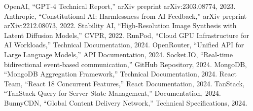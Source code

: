 \documentclass[conference]{IEEEtran}
\begin{document}
\begin{thebibliography}{00}
 OpenAI, ``GPT-4 Technical Report,'' arXiv preprint arXiv:2303.08774, 2023.
 Anthropic, ``Constitutional AI: Harmlessness from AI Feedback,'' arXiv preprint arXiv:2212.08073, 2022.
 Stability AI, ``High-Resolution Image Synthesis with Latent Diffusion Models,'' CVPR, 2022.
 RunPod, ``Cloud GPU Infrastructure for AI Workloads,'' Technical Documentation, 2024.
 OpenRouter, ``Unified API for Large Language Models,'' API Documentation, 2024.
 Socket.IO, ``Real-time bidirectional event-based communication,'' GitHub Repository, 2024.
 MongoDB, ``MongoDB Aggregation Framework,'' Technical Documentation, 2024.
 React Team, ``React 18 Concurrent Features,'' React Documentation, 2024.
 TanStack, ``TanStack Query for Server State Management,'' Documentation, 2024.
 BunnyCDN, ``Global Content Delivery Network,'' Technical Specifications, 2024.
\end{thebibliography}
\end{document}
